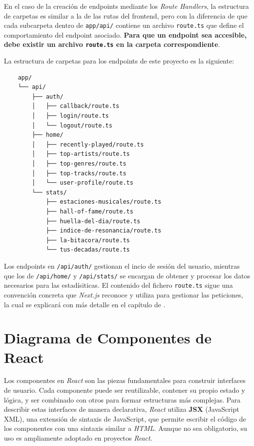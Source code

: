 En el caso de la creación de endpoints mediante los \textit{Route Handlers}, la estructura de carpetas es similar a la de las rutas del frontend, pero con la diferencia de que cada subcarpeta dentro de \texttt{app/api/} contiene un archivo \texttt{route.ts} que define el comportamiento del endpoint asociado. \textbf{Para que un endpoint sea accesible, debe existir un archivo \texttt{route.ts} en la carpeta correspondiente}.

La estructura de carpetas para los endpoints de este proyecto es la siguiente:

\newpage

\begin{verbatim}
    app/
    └── api/
        ├── auth/
        │   ├── callback/route.ts
        │   ├── login/route.ts
        │   └── logout/route.ts
        ├── home/
        │   ├── recently-played/route.ts
        │   ├── top-artists/route.ts
        │   ├── top-genres/route.ts
        │   ├── top-tracks/route.ts
        │   └── user-profile/route.ts
        └── stats/
            ├── estaciones-musicales/route.ts
            ├── hall-of-fame/route.ts
            ├── huella-del-dia/route.ts
            ├── indice-de-resonancia/route.ts
            ├── la-bitacora/route.ts
            └── tus-decadas/route.ts
\end{verbatim}

Los endpoints en \texttt{/api/auth/} gestionan el incio de sesión del usuario, mientras que los de \texttt{/api/home/} y \texttt{/api/stats/} se encargan de obtener y procesar los datos necesarios para las estadísiticas. El contenido del fichero \texttt{route.ts} sigue una convención concreta que \textit{Next.js} reconoce y utiliza para gestionar las peticiones, la cual se explicará con más detalle en el capítulo de .

\section{Diagrama de Componentes de React} \label{sec:diagrama_componentes_react}

Los componentes en \textit{React} son las piezas fundamentales para construir interfaces de usuario. Cada componente puede ser reutilizable, contener su propio estado y lógica, y ser combinado con otros para formar estructuras más complejas. Para describir estas interfaces de manera declarativa, \textit{React} utiliza \textbf{JSX} (JavaScript XML), una extensión de sintaxis de JavaScript, que permite escribir el código de los componentes con una sintaxis similar a \textit{HTML}. Aunque no sea obligatorio, su uso es ampliamente adoptado en proyectos \textit{React}.

